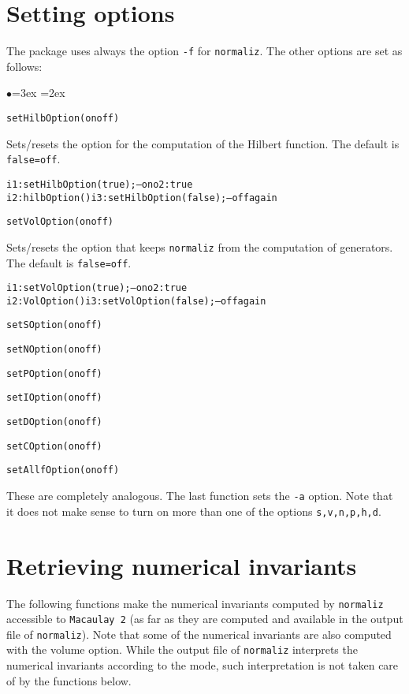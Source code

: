 \documentclass[11pt]{amsart}
\newenvironment{example}
  {\begin{alltt}\small}
  {\end{alltt}}
\newenvironment{functions}
  {\begin{list}{$\bullet$}{\leftmargin=3ex \labelwidth=2ex
  \listparindent=0pt \itemsep=6pt \parsep=3pt}}
  {\end{list}}
\begin{document}
\section{Setting options}
\label{Opt}
The package uses always the option {\tt -f} for {\tt normaliz}.
The other options are set as follows:

\begin{functions}
\item\verb+setHilbOption(onoff)+

Sets/resets the option for the computation of the Hilbert
function. The default is {\tt false=off}.
\begin{example}
i1 : setHilbOption(true); -- on      o2 : true
i2 : hilbOption()                    i3 : setHilbOption(false); -- off again
\end{example}


\item\verb+setVolOption(onoff)+

Sets/resets the option that keeps {\tt normaliz} from the
computation of generators. The default is {\tt false=off}.

\begin{example}
i1 : setVolOption(true); -- on       o2 : true
i2 : VolOption()                     i3 : setVolOption(false); -- off again
\end{example}

\item\verb+setSOption(onoff)+
\item\verb+setNOption(onoff)+
\item\verb+setPOption(onoff)+
\item\verb+setIOption(onoff)+
\item\verb+setDOption(onoff)+
\item\verb+setCOption(onoff)+
\item\verb+setAllfOption(onoff)+

These are completely analogous. The last function sets the
\texttt{-a} option. Note that it does not make sense to turn
 on more than one of the options {\tt s,v,n,p,h,d}.
\end{functions}


\section{Retrieving numerical invariants}

The following functions make the numerical invariants computed by
{\tt normaliz} accessible to {\tt Macaulay 2} (as far as they are
computed and available in the output file of {\tt normaliz}). Note
that some of the numerical invariants are also computed with the
volume option. While the output file of {\tt normaliz} interprets
the numerical invariants according to the mode, such
interpretation is not taken care of by the functions below.
\end{document}
